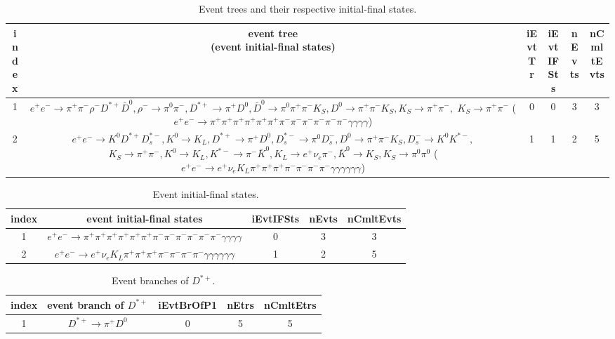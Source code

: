 \documentclass[landscape]{article}
\begin{document}
\begin{table}[htbp!]
\renewcommand\cellgape{\Gape[1pt]}
\caption{Event trees and their respective initial-final states.}
\small
\centering
\begin{tabular}{|c|c|c|c|c|c|}
\hline
index & \thead{event tree \\ (event initial-final states)} & iEvtTr & iEvtIFSts & nEvts & nCmltEvts \\
\hline
1 & \makecell{ $ 
e^{+} e^{-} \rightarrow \pi^{+} \pi^{-} \rho^{-} D^{*+} \bar{D}^{0} ,
\rho^{-} \rightarrow \pi^{0} \pi^{-} ,
D^{*+} \rightarrow \pi^{+} D^{0} ,
\bar{D}^{0} \rightarrow \pi^{0} \pi^{+} \pi^{-} K_{S} ,
D^{0} \rightarrow \pi^{+} \pi^{-} K_{S} ,
K_{S} \rightarrow \pi^{+} \pi^{-} ,
$ \\ $
K_{S} \rightarrow \pi^{+} \pi^{-} 
$ \\ ($
e^{+} e^{-} \rightarrow \pi^{+} \pi^{+} \pi^{+} \pi^{+} \pi^{+} \pi^{+} \pi^{-} \pi^{-} \pi^{-} \pi^{-} \pi^{-} \pi^{-} \gamma \gamma \gamma \gamma 
$) } & 0 & 0 & 3 & 3 \\
\hline
2 & \makecell{ $ 
e^{+} e^{-} \rightarrow K^{0} D^{*+} D_{s}^{*-} ,
K^{0} \rightarrow K_{L} ,
D^{*+} \rightarrow \pi^{+} D^{0} ,
D_{s}^{*-} \rightarrow \pi^{0} D_{s}^{-} ,
D^{0} \rightarrow \pi^{+} \pi^{-} K_{S} ,
D_{s}^{-} \rightarrow K^{0} K^{*-} ,
$ \\ $
K_{S} \rightarrow \pi^{+} \pi^{-} ,
K^{0} \rightarrow K_{L} ,
K^{*-} \rightarrow \pi^{-} \bar{K}^{0} ,
K_{L} \rightarrow e^{+} \nu_{e} \pi^{-} ,
\bar{K}^{0} \rightarrow K_{S} ,
K_{S} \rightarrow \pi^{0} \pi^{0} 
$ \\ ($
e^{+} e^{-} \rightarrow e^{+} \nu_{e} K_{L} \pi^{+} \pi^{+} \pi^{+} \pi^{-} \pi^{-} \pi^{-} \pi^{-} \gamma \gamma \gamma \gamma \gamma \gamma 
$) } & 1 & 1 & 2 & 5 \\
\hline
\end{tabular}
\end{table}

\clearpage

\begin{table}[htbp!]
\caption{Event initial-final states.}
\small
\centering
\begin{tabular}{|c|c|c|c|c|}
\hline
index & event initial-final states & iEvtIFSts & nEvts & nCmltEvts \\
\hline
1 & $ e^{+} e^{-} \rightarrow \pi^{+} \pi^{+} \pi^{+} \pi^{+} \pi^{+} \pi^{+} \pi^{-} \pi^{-} \pi^{-} \pi^{-} \pi^{-} \pi^{-} \gamma \gamma \gamma \gamma $ & 0 & 3 & 3 \\
\hline
2 & $ e^{+} e^{-} \rightarrow e^{+} \nu_{e} K_{L} \pi^{+} \pi^{+} \pi^{+} \pi^{-} \pi^{-} \pi^{-} \pi^{-} \gamma \gamma \gamma \gamma \gamma \gamma $ & 1 & 2 & 5 \\
\hline
\end{tabular}
\end{table}

\clearpage

\begin{table}[htbp!]
\caption{Event branches of $ D^{*+} $.}
\small
\centering
\begin{tabular}{|c|c|c|c|c|}
\hline
index & event branch of $ D^{*+} $ & iEvtBrOfP1 & nEtrs & nCmltEtrs \\
\hline
1 & $ D^{*+} \rightarrow \pi^{+} D^{0} $ & 0 & 5 & 5 \\
\hline
\end{tabular}
\end{table}
\end{document}
